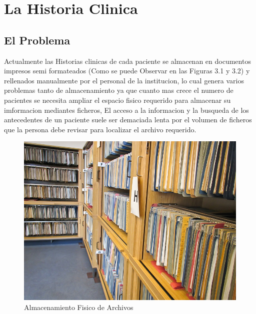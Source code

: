 \chapter{La Historia Clinica}

\section{El Problema}

Actualmente las Historias clinicas de cada paciente se almacenan en documentos
impresos semi formateados (Como se puede Observar en las Figuras 3.1 y 3.2)
y rellenados manualmente por el personal de la
institucion, lo cual genera varios problemas tanto de almacenamiento ya que cuanto
mas crece el numero de pacientes se necesita ampliar el espacio fisico requerido
para almacenar su imformacion mediantes ficheros, El acceso a la informacion
y la busqueda de los antecedentes de un paciente suele ser demaciada lenta
por el volumen de ficheros que la persona debe revisar para localizar el
archivo requerido. 

\begin{figure}[h]
    \centering
    \includegraphics[scale=1.5]{resourse/folders-archivos.jpg}
    \caption{Almacenamiento Fisico de Archivos}
    \label{fig:05}
\end{figure}  


